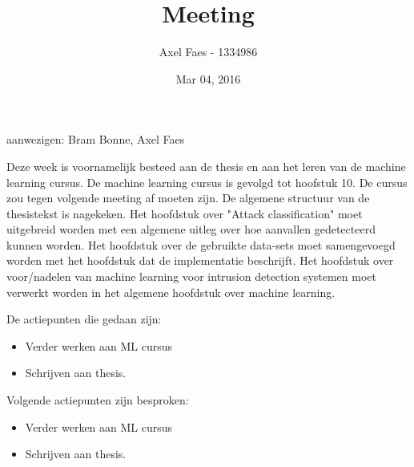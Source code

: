\documentclass[notitlepage]{article}
\title{Meeting}
\author{Axel Faes - 1334986}
\date{Mar 04, 2016}
\begin{document}
\maketitle

aanwezigen: Bram Bonne, Axel Faes

Deze week is voornamelijk besteed aan de thesis en aan het leren van de machine learning cursus. De machine learning cursus is gevolgd tot hoofstuk 10. De cursus zou tegen volgende meeting af moeten zijn. De algemene structuur van de thesistekst is nagekeken. Het hoofdstuk over "Attack classification" moet uitgebreid worden met een algemene uitleg over hoe aanvallen gedetecteerd kunnen worden. Het hoofdstuk over de gebruikte data-sets moet samengevoegd worden met het hoofdstuk dat de implementatie beschrijft. Het hoofdstuk over voor/nadelen van machine learning voor intrusion detection systemen moet verwerkt worden in het algemene hoofdstuk over machine learning.

De actiepunten die gedaan zijn:
\begin{itemize}  
		\item Verder werken aan ML cursus
        \item Schrijven aan thesis.
\end{itemize}

Volgende actiepunten zijn besproken:
\begin{itemize}  		
\item Verder werken aan ML cursus
        \item Schrijven aan thesis.
\end{itemize}
\end{document}

